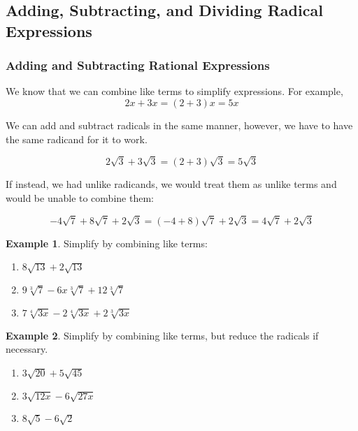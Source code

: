\documentclass[addpoints,12pt]{exam}
\theoremstyle{definition}
\newtheorem{example}{Example}[subsection]
\begin{document}
\setcounter{section}{10}
\setcounter{subsection}{3}

\subsection{Adding, Subtracting, and Dividing Radical Expressions}

\subsubsection*{Adding and Subtracting Rational Expressions}

We know that we can combine like terms to simplify expressions. For example,
\[2x + 3x = (2+3)x = 5x\]

We can add and subtract radicals in the same manner, however, we have to have the same radicand for it to work.

\[2\sqrt{3} + 3\sqrt{3} = (2+3)\sqrt{3} = 5\sqrt{3}\]

If instead, we had unlike radicands, we would treat them as unlike terms and would be unable to combine them:

\[-4\sqrt{7}+8\sqrt{7} + 2\sqrt{3} = (-4+8)\sqrt{7} + 2\sqrt{3} = 4\sqrt{7} + 2\sqrt{3}\]

\vspace{.25in}

\begin{example}
Simplify by combining like terms:
\begin{enumerate}
\item $8\sqrt{13} + 2\sqrt{13}$
\vspace{1in}
\item $9\sqrt[3]{7}-6x\sqrt[3]{7}+12\sqrt[3]{7}$
\vspace{1in}
\item $7\sqrt[4]{3x} - 2\sqrt[4]{3x} + 2\sqrt[3]{3x}$
\vspace{1.5in}
\end{enumerate}
\end{example}

\newpage

\begin{example}
Simplify by combining like terms, but reduce the radicals if necessary.
\begin{enumerate}
\item $3\sqrt{20} + 5\sqrt{45}$
\vspace{1.25in}
\item $3\sqrt{12x} - 6\sqrt{27x}$
\vspace{1.25in}
\item $8\sqrt{5} - 6\sqrt{2}$
\vspace{1.25in}
\end{enumerate}
\end{example}
\end{document}
